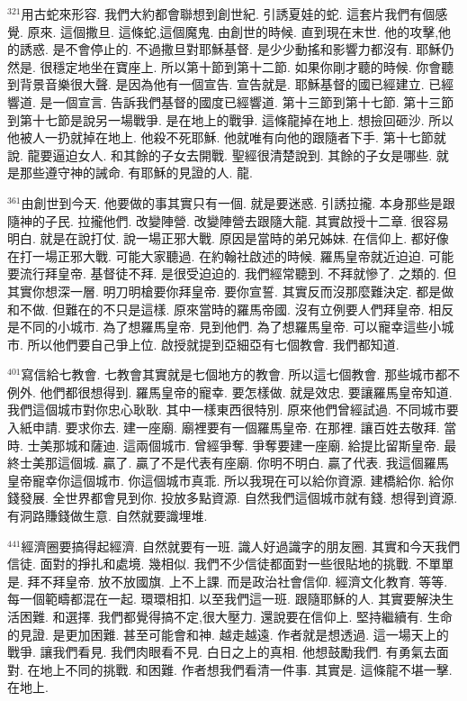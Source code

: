 \documentclass{book}
\begin{document}
$^{321}$用古蛇來形容.
我們大約都會聯想到創世紀.
引誘夏娃的蛇.
這套片我們有個感覺.
原來.
這個撒旦.
這條蛇,這個魔鬼.
由創世的時候.
直到現在末世.
他的攻擊,他的誘惑.
是不會停止的.
不過撒旦對耶穌基督.
是少少動搖和影響力都沒有.
耶穌仍然是.
很穩定地坐在寶座上.
所以第十節到第十二節.
如果你剛才聽的時候.
你會聽到背景音樂很大聲.
是因為他有一個宣告.
宣告就是.
耶穌基督的國已經建立.
已經響道.
是一個宣言.
告訴我們基督的國度已經響道.
第十三節到第十七節.
第十三節到第十七節是說另一場戰爭.
是在地上的戰爭.
這條龍掉在地上.
想撿回砸沙.
所以他被人一扔就掉在地上.
他殺不死耶穌.
他就唯有向他的跟隨者下手.
第十七節就說.
龍要逼迫女人.
和其餘的子女去開戰.
聖經很清楚說到.
其餘的子女是哪些.
就是那些遵守神的誡命.
有耶穌的見證的人.
龍.

$^{361}$由創世到今天.
他要做的事其實只有一個.
就是要迷惑.
引誘拉攏.
本身那些是跟隨神的子民.
拉攏他們.
改變陣營.
改變陣營去跟隨大龍.
其實啟授十二章.
很容易明白.
就是在說打仗.
說一場正邪大戰.
原因是當時的弟兄姊妹.
在信仰上.
都好像在打一場正邪大戰.
可能大家聽過.
在約翰社啟述的時候.
羅馬皇帝就近迫迫.
可能要流行拜皇帝.
基督徒不拜.
是很受迫迫的.
我們經常聽到.
不拜就慘了.
之類的.
但其實你想深一層.
明刀明槍要你拜皇帝.
要你宣誓.
其實反而沒那麼難決定.
都是做和不做.
但難在的不只是這樣.
原來當時的羅馬帝國.
沒有立例要人們拜皇帝.
相反是不同的小城市.
為了想羅馬皇帝.
見到他們.
為了想羅馬皇帝.
可以寵幸這些小城市.
所以他們要自己爭上位.
啟授就提到亞細亞有七個教會.
我們都知道.

$^{401}$寫信給七教會.
七教會其實就是七個地方的教會.
所以這七個教會.
那些城市都不例外.
他們都很想得到.
羅馬皇帝的寵幸.
要怎樣做.
就是效忠.
要讓羅馬皇帝知道.
我們這個城市對你忠心耿耿.
其中一樣東西很特別.
原來他們曾經試過.
不同城市要入紙申請.
要求你去.
建一座廟.
廟裡要有一個羅馬皇帝.
在那裡.
讓百姓去敬拜.
當時.
士美那城和薩迪.
這兩個城市.
曾經爭奪.
爭奪要建一座廟.
給提比留斯皇帝.
最終士美那這個城.
贏了.
贏了不是代表有座廟.
你明不明白.
贏了代表.
我這個羅馬皇帝寵幸你這個城市.
你這個城市真乖.
所以我現在可以給你資源.
建橋給你.
給你錢發展.
全世界都會見到你.
投放多點資源.
自然我們這個城市就有錢.
想得到資源.
有洞路賺錢做生意.
自然就要識埋堆.

$^{441}$經濟圈要搞得起經濟.
自然就要有一班.
識人好過識字的朋友圈.
其實和今天我們信徒.
面對的掙扎和處境.
幾相似.
我們不少信徒都面對一些很貼地的挑戰.
不單單是.
拜不拜皇帝.
放不放國旗.
上不上課.
而是政治社會信仰.
經濟文化教育.
等等.
每一個範疇都混在一起.
環環相扣.
以至我們這一班.
跟隨耶穌的人.
其實要解決生活困難.
和選擇.
我們都覺得搞不定,很大壓力.
還說要在信仰上.
堅持繼續有.
生命的見證.
是更加困難.
甚至可能會和神.
越走越遠.
作者就是想透過.
這一場天上的戰爭.
讓我們看見.
我們肉眼看不見.
白日之上的真相.
他想鼓勵我們.
有勇氣去面對.
在地上不同的挑戰.
和困難.
作者想我們看清一件事.
其實是.
這條龍不堪一擊.
在地上.
\end{document}
